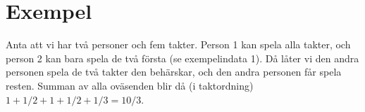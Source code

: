 \section*{Exempel}
Anta att vi har två personer och fem takter. Person 1 kan spela alla takter, och person 2 kan bara spela de två första (se exempelindata 1). Då låter vi den andra personen spela de två takter den behärskar, och den andra personen får spela resten. Summan av alla oväsenden blir då (i taktordning) $1 + 1/2 + 1 + 1/2 + 1/3 = 10/3$.
